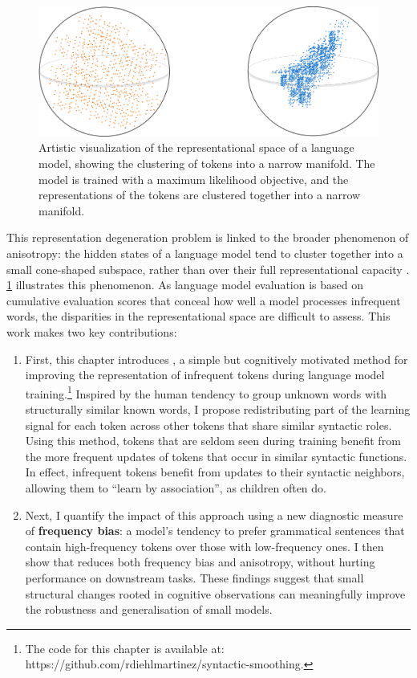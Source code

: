 \begin{figure}[ht!]
    \centering
    \includegraphics[width=0.8\linewidth]{chapters/syntatic-smoothing/figures/anisotropy_visualization.pdf}
    \caption{Artistic visualization of the representational space of a language model, showing the clustering of tokens into a narrow manifold. The model is trained with a maximum likelihood objective, and the representations of the tokens are clustered together into a narrow manifold.}
    \label{fig:anisotropy_visualization}
\end{figure}

\newpage

This representation degeneration problem is linked to the broader phenomenon of anisotropy: the hidden states of a language model tend to cluster together into a small cone-shaped subspace, rather than over their full representational capacity \citep{arora2016latent, ethayarajh2019contextual, gao2018representation}. \cref{fig:anisotropy_visualization} illustrates this phenomenon. As language model evaluation is based on cumulative evaluation scores that conceal how well a model processes infrequent words, the disparities in the representational space are difficult to assess. This work makes two key contributions:

\begin{enumerate}
    \item First, this chapter introduces \smoothing, a simple but cognitively motivated method for improving the representation of infrequent tokens during language model training.\footnote{The code for this chapter is available at: https://github.com/rdiehlmartinez/syntactic-smoothing.} Inspired by the human tendency to group unknown words with structurally similar known words, I propose redistributing part of the learning signal for each token across other tokens that share similar syntactic roles. Using this method, tokens that are seldom seen during training benefit from the more frequent updates of tokens that occur in similar syntactic functions.  In effect, infrequent tokens benefit from updates to their syntactic neighbors, allowing them to ``learn by association'', as children often do.
    \item Next, I quantify the impact of this approach using a new diagnostic measure of \textbf{frequency bias}: a model's tendency to prefer grammatical sentences that contain high-frequency tokens over those with low-frequency ones. I then show that \smoothing reduces both frequency bias and anisotropy, without hurting performance on downstream tasks. These findings suggest that small structural changes rooted in cognitive observations can meaningfully improve the robustness and generalisation of small models.
     
\end{enumerate}

